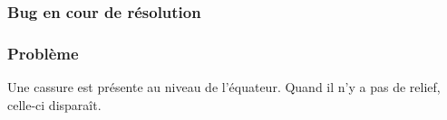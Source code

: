 

\subsubsection{Bug en cour de résolution}

\subsubsection{Problème}
Une cassure est présente au niveau de l'équateur. Quand il n'y a pas de relief, celle-ci disparaît.